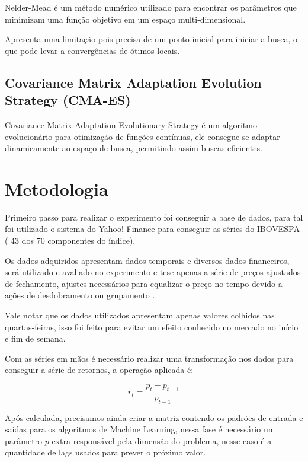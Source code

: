\documentclass[preprint,12pt]{elsarticle}
\begin{document}
Nelder-Mead \cite{Nelder1965} é um método numérico utilizado para encontrar os parâmetros que minimizam uma função objetivo em um espaço multi-dimensional.

Apresenta uma limitação pois precisa de um ponto inicial para iniciar a busca, o que pode levar a convergências de ótimos locais.

\subsection{Covariance Matrix Adaptation Evolution Strategy (CMA-ES)}

Covariance Matrix Adaptation Evolutionary Strategy \cite{Hansen2001} \cite{wiki:xxx} é um algoritmo evolucionário para otimização de funções contínuas, ele consegue se adaptar dinamicamente ao espaço de busca, permitindo assim buscas eficientes.

\section{Metodologia}

Primeiro passo para realizar o experimento foi conseguir a base de dados, para tal foi utilizado o sistema do Yahoo! Finance \cite{yahoo} para conseguir as séries do IBOVESPA ( 43 dos 70 componentes do índice). 

Os dados adquiridos apresentam dados temporais e diversos dados financeiros, será utilizado e avaliado no experimento e tese apenas a série de preços ajustados de fechamento, ajustes necessários para equalizar o preço no tempo devido a ações de desdobramento ou grupamento \cite{invest}.

Vale notar que os dados utilizados apresentam apenas valores colhidos nas quartas-feiras, isso foi feito para evitar um efeito\cite[p. 404]{mptbook} conhecido no mercado no início e fim de semana.

Com as séries em mãos é necessário realizar uma transformação nos dados para conseguir a série de retornos, a operação aplicada é:

\begin{equation}
r_{t} = \frac{p_{t} - p_{t-1}}{p_{t-1}}
\end{equation}

Após calculada, precisamos ainda criar a matriz contendo os padrões de entrada e saídas para os algoritmos de Machine Learning, nessa fase é necessário um parâmetro $p$ extra responsável pela dimensão do problema, nesse caso é a quantidade de lags usados para prever o próximo valor.
\end{document}
